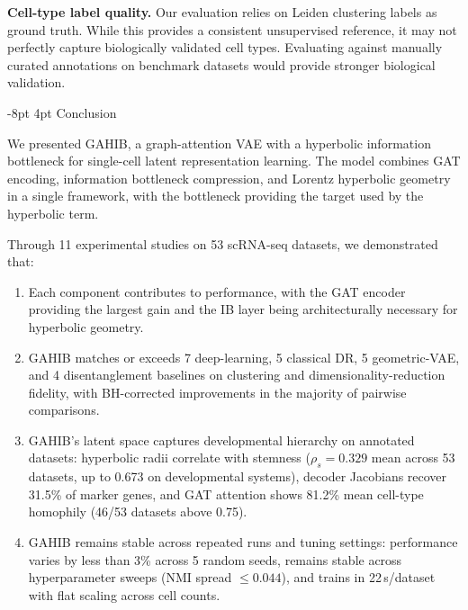 \documentclass[preprint,12pt]{elsarticle}
\makeatletter
\renewcommand\section{\@startsection{section}{1}{\z@}%
  {-8pt \@plus -2pt \@minus -2pt}%
  {4pt \@plus 1pt \@minus 1pt}%
  {\normalfont\Large\bfseries}}
\makeatother
\begin{document}
\textbf{Cell-type label quality.}
Our evaluation relies on Leiden clustering labels as ground truth.
While this provides a consistent unsupervised reference, it may not
perfectly capture biologically validated cell types.
Evaluating against manually curated annotations on benchmark datasets
would provide stronger biological validation.


\section{Conclusion}\label{sec:conclusion}

We presented GAHIB, a graph-attention VAE with a hyperbolic
information bottleneck for single-cell latent representation learning.
The model combines GAT encoding, information bottleneck compression,
and Lorentz hyperbolic geometry in a single framework, with the
bottleneck providing the target used by the hyperbolic term.

Through 11 experimental studies on 53 scRNA-seq datasets, we
demonstrated that:
\begin{enumerate}[leftmargin=*,itemsep=2pt]
\item Each component contributes to performance, with the GAT encoder
  providing the largest gain and the IB layer being architecturally
  necessary for hyperbolic geometry.
\item GAHIB matches or exceeds 7 deep-learning, 5 classical DR, 5
  geometric-VAE, and 4 disentanglement baselines on clustering and
  dimensionality-reduction fidelity, with BH-corrected improvements in
  the majority of pairwise comparisons.
\item GAHIB's latent space captures developmental hierarchy on
  annotated datasets: hyperbolic radii correlate with stemness
  ($\rho_s{=}0.329$ mean across 53 datasets, up to 0.673 on
  developmental systems), decoder Jacobians recover 31.5\% of marker
  genes, and GAT attention shows 81.2\% mean cell-type homophily
  (46/53 datasets above 0.75).
\item GAHIB remains stable across repeated runs and tuning settings:
  performance varies by less than 3\% across 5 random seeds, remains
  stable across hyperparameter sweeps (NMI spread $\leq 0.044$), and
  trains in 22\,s/dataset with flat scaling across cell counts.
\end{enumerate}
\end{document}
